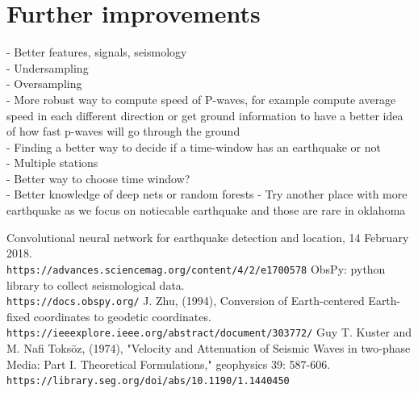 \documentclass[10pt,conference,compsocconf]{IEEEtran}
\begin{document}
\section{Further improvements}
- Better features, signals, seismology\\
- Undersampling\\
- Oversampling\\
- More robust way to compute speed of P-waves, for example compute average speed in each different direction or get ground information to have a better idea of how fast p-waves will go through the ground\\
- Finding a better way to decide if a time-window has an earthquake or not\\
- Multiple stations\\
- Better way to choose time window?\\
- Better knowledge of deep nets or random forests
- Try another place with more earthquake as we focus on notiecable earthquake and those are rare in oklahoma

\begin{thebibliography}{9}
Convolutional neural network for earthquake detection and location, 14 February 2018. \\\texttt{https://advances.sciencemag.org/content/4/2/e1700578}
ObsPy: python library to collect seismological data.
\\\texttt{https://docs.obspy.org/}
J. Zhu, (1994),  Conversion of Earth-centered Earth-fixed coordinates to geodetic coordinates. \\\texttt{https://ieeexplore.ieee.org/abstract/document/303772/}
Guy T. Kuster and M. Nafi Toksöz, (1974), "Velocity and Attenuation of Seismic Waves in two‐phase Media: Part I. Theoretical Formulations," geophysics 39: 587-606. \\\texttt{https://library.seg.org/doi/abs/10.1190/1.1440450}
\end{thebibliography}
\end{document}
